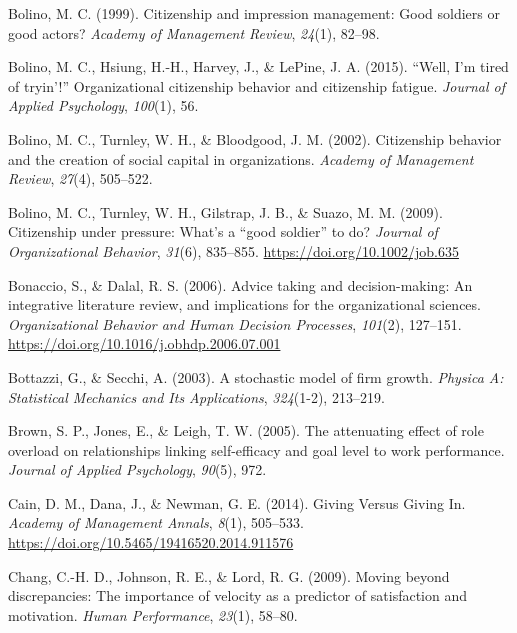 \documentclass[english,,man]{apa6}
\begin{document}
\leavevmode\hypertarget{ref-bolino_citizenship_1999}{}%
Bolino, M. C. (1999). Citizenship and impression management: Good soldiers or good actors? \emph{Academy of Management Review}, \emph{24}(1), 82--98.

\leavevmode\hypertarget{ref-bolino_well_2015}{}%
Bolino, M. C., Hsiung, H.-H., Harvey, J., \& LePine, J. A. (2015). ``Well, I'm tired of tryin'!'' Organizational citizenship behavior and citizenship fatigue. \emph{Journal of Applied Psychology}, \emph{100}(1), 56.

\leavevmode\hypertarget{ref-bolino_citizenship_2002}{}%
Bolino, M. C., Turnley, W. H., \& Bloodgood, J. M. (2002). Citizenship behavior and the creation of social capital in organizations. \emph{Academy of Management Review}, \emph{27}(4), 505--522.

\leavevmode\hypertarget{ref-bolino_citizenship_2009}{}%
Bolino, M. C., Turnley, W. H., Gilstrap, J. B., \& Suazo, M. M. (2009). Citizenship under pressure: What's a ``good soldier'' to do? \emph{Journal of Organizational Behavior}, \emph{31}(6), 835--855. \url{https://doi.org/10.1002/job.635}

\leavevmode\hypertarget{ref-bonaccio_advice_2006}{}%
Bonaccio, S., \& Dalal, R. S. (2006). Advice taking and decision-making: An integrative literature review, and implications for the organizational sciences. \emph{Organizational Behavior and Human Decision Processes}, \emph{101}(2), 127--151. \url{https://doi.org/10.1016/j.obhdp.2006.07.001}

\leavevmode\hypertarget{ref-bottazzi_stochastic_2003}{}%
Bottazzi, G., \& Secchi, A. (2003). A stochastic model of firm growth. \emph{Physica A: Statistical Mechanics and Its Applications}, \emph{324}(1-2), 213--219.

\leavevmode\hypertarget{ref-brown_attenuating_2005}{}%
Brown, S. P., Jones, E., \& Leigh, T. W. (2005). The attenuating effect of role overload on relationships linking self-efficacy and goal level to work performance. \emph{Journal of Applied Psychology}, \emph{90}(5), 972.

\leavevmode\hypertarget{ref-cain_giving_2014}{}%
Cain, D. M., Dana, J., \& Newman, G. E. (2014). Giving Versus Giving In. \emph{Academy of Management Annals}, \emph{8}(1), 505--533. \url{https://doi.org/10.5465/19416520.2014.911576}

\leavevmode\hypertarget{ref-chang_moving_2009}{}%
Chang, C.-H. D., Johnson, R. E., \& Lord, R. G. (2009). Moving beyond discrepancies: The importance of velocity as a predictor of satisfaction and motivation. \emph{Human Performance}, \emph{23}(1), 58--80.
\end{document}

